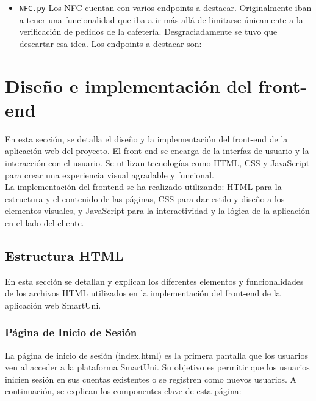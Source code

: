 \documentclass[12pt]{report}
\begin{document}
\begin{itemize}
\begin{itemize}
\begin{itemize}
    \end{itemize}

    \item \texttt{NFC.py}
    Los NFC cuentan con varios endpoints a destacar. Originalmente iban a tener una funcionalidad que iba a ir más allá de limitarse únicamente a la verificación de pedidos de la cafetería. Desgraciadamente se tuvo que descartar esa idea. Los endpoints a destacar son:
    
\end{itemize}
    
\end{itemize}

\chapter{Diseño e implementación del front-end}
En esta sección, se detalla el diseño y la implementación del front-end de la aplicación web del proyecto. El front-end se encarga de la interfaz de usuario y la interacción con el usuario. Se utilizan tecnologías como HTML, CSS y JavaScript para crear una experiencia visual agradable y funcional. \\

La implementación del front\textendash end se ha realizado utilizando: HTML para la estructura y el contenido de las páginas, CSS para dar estilo y diseño a los elementos visuales, y JavaScript para la interactividad y la lógica de la aplicación en el lado del cliente.
\\

\section{Estructura HTML}
En esta sección se detallan y explican los diferentes elementos y funcionalidades de los archivos HTML utilizados en la implementación del front-end de la aplicación web SmartUni.
\subsection{Página de Inicio de Sesión}
La página de inicio de sesión (index.html) es la primera pantalla que los usuarios ven al acceder a la plataforma SmartUni. Su objetivo es permitir que los usuarios inicien sesión en sus cuentas existentes o se registren como nuevos usuarios. A continuación, se explican los componentes clave de esta página:
\end{document}
